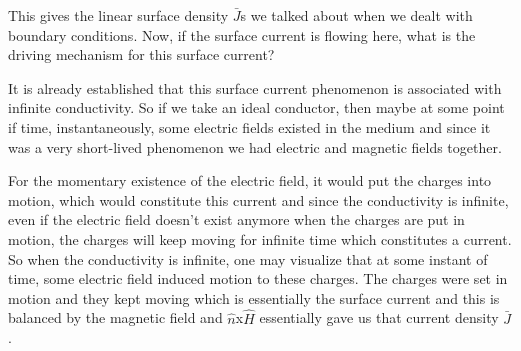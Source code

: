 This gives the linear surface density $\bar{J}$s we talked about when we dealt with boundary conditions. Now, if the surface current is flowing here, what is the driving mechanism for this surface current?

It is already established that this surface current phenomenon is associated with infinite conductivity. So if we take an ideal conductor, then maybe at some point if time, instantaneously, some electric fields existed in the medium and since it was a very short-lived phenomenon we had electric and magnetic fields together.

For the momentary existence of the electric field, it would put the charges into motion, which would constitute this current and since the conductivity is infinite, even if the electric field doesn't exist anymore when the charges are put in motion, the charges will keep moving for infinite time which constitutes a current. So when the conductivity is infinite, one may visualize that at some instant of time, some electric field induced motion to these charges. The charges were set in motion and they kept moving which is essentially the surface current and this is balanced by the magnetic field and $\hat{n}$x$\hat{H}$ essentially gave us that current density $\bar{J}$.


